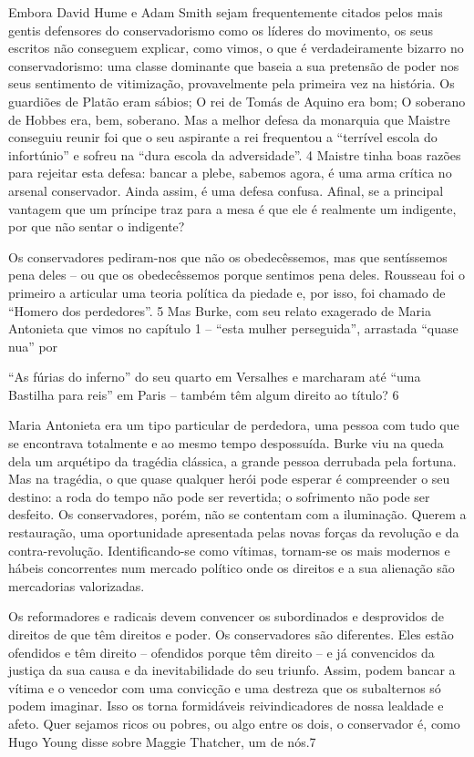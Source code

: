  \par 
Embora David Hume e Adam Smith sejam frequentemente citados pelos mais gentis defensores do conservadorismo como os líderes do movimento, os seus escritos não conseguem explicar, como vimos, o que é verdadeiramente bizarro no conservadorismo: uma classe dominante que baseia a sua pretensão de poder nos seus sentimento de vitimização, provavelmente pela primeira vez na história. Os guardiões de Platão eram sábios; O rei de Tomás de Aquino era bom; O soberano de Hobbes era, bem, soberano. Mas a melhor defesa da monarquia que Maistre conseguiu reunir foi que o seu aspirante a rei frequentou a “terrível escola do infortúnio” e sofreu na “dura escola da adversidade”. {\color{blue}4} Maistre tinha boas razões para rejeitar esta defesa: bancar a plebe, sabemos agora, é uma arma crítica no arsenal conservador. Ainda assim, é uma defesa confusa. Afinal, se a principal vantagem que um príncipe traz para a mesa é que ele é realmente um indigente, por que não sentar o indigente?
 \par 
Os conservadores pediram-nos que não os obedecêssemos, mas que sentíssemos pena deles – ou que os obedecêssemos porque sentimos pena deles. Rousseau foi o primeiro a articular uma teoria política da piedade e, por isso, foi chamado de “Homero dos perdedores”. {\color{blue}5} Mas Burke, com seu relato exagerado de Maria Antonieta que vimos no capítulo {\color{blue}1} – “esta mulher perseguida”, arrastada “quase nua” por
 \par 
“As fúrias do inferno” do seu quarto em Versalhes e marcharam até “uma Bastilha para reis” em Paris – também têm algum direito ao título? {\color{blue}6}
 \par 
Maria Antonieta era um tipo particular de perdedora, uma pessoa com tudo que se encontrava totalmente e ao mesmo tempo despossuída. Burke viu na queda dela um arquétipo da tragédia clássica, a grande pessoa derrubada pela fortuna. Mas na tragédia, o que quase qualquer herói pode esperar é compreender o seu destino: a roda do tempo não pode ser revertida; o sofrimento não pode ser desfeito. Os conservadores, porém, não se contentam com a iluminação. Querem a restauração, uma oportunidade apresentada pelas novas forças da revolução e da contra-revolução. Identificando-se como vítimas, tornam-se os mais modernos e hábeis concorrentes num mercado político onde os direitos e a sua alienação são mercadorias valorizadas.
 \par 
Os reformadores e radicais devem convencer os subordinados e desprovidos de direitos de que têm direitos e poder. Os conservadores são diferentes. Eles estão ofendidos e têm direito – ofendidos porque têm direito – e já convencidos da justiça da sua causa e da inevitabilidade do seu triunfo. Assim, podem bancar a vítima e o vencedor com uma convicção e uma destreza que os subalternos só podem imaginar. Isso os torna formidáveis ​​reivindicadores de nossa lealdade e afeto. Quer sejamos ricos ou pobres, ou algo entre os dois, o conservador é, como Hugo Young disse sobre Maggie Thatcher, um de nós.{\color{blue}7}
